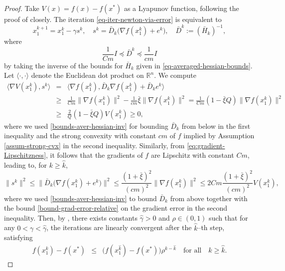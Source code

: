 \documentclass[final,numbook]{svjour3}
\begin{document}
\begin{proof}
   Take $V(x) = f(x) - f(x^*)$ as a Lyapunov function, following the proof of \cite[Theorem 2, Section 4.2.3]{Pol87} closely. The iteration \eqref{eq-iter-newton-via-error} is equivalent to 
   $$ x_1^{k+1} = x_1^k - \gamma s^k, \quad s^k = \bar{D}_k(\nabla f(x_1^k) + e^k \big), \quad \bar{D}^k := (\bar{H}_k)^{-1}, $$
where \begin{equation}\label{bounds-aver-hessian-inv} \frac{1}{Cm}I \preceq \bar{D}^k \preceq \frac{1}{cm}I
\end{equation}
by taking the inverse of the bounds for $\bar{H}_k$ given in \eqref{eq-averaged-hessian-bounds}. Let $\langle \cdot,\cdot \rangle$ denote the Euclidean dot product on ${\mathbb R}^n$. We compute 
  \begin{eqnarray*} \langle \nabla V (x_1^k), s^k \rangle &=& \langle \nabla f(x_1^k), \bar{D}_k\nabla f(x_1^k) + \bar{D}_k e^k  \rangle \\
   &\geq & \frac{1}{Cm} \| \nabla f(x_1^k) \|^2 - \frac{1}{cm} {{\bar{\xi}}}\| \nabla f(x_1^k) \|^2 =  \frac{1}{Cm} (1-{{\bar{\xi}}} Q)\| \nabla f(x_1^k) \|^2 \\
   & \geq & \frac{2}{Q}(1-{{\bar{\xi}}} Q) V(x_1^k) \geq 0,
  \end{eqnarray*}
where we used \eqref{bounds-aver-hessian-inv} for bounding $\bar{D}_k$ from below in the first inequality and the strong convexity with constant $cm$ of $f$ implied by Assumption \ref{assum-strong-cvx} in the second inequality.
Similarly, from \eqref{eq:gradient-Lipschitzness}, it follows that the gradients of $f$ are Lipschitz with constant $Cm$, leading to, for $k \geq {\hat{k}}$,
  $$ \|s^k\|^2 \leq \| \bar{D}_k(\nabla f(x_1^k) + e^k \big)\|^2 \leq \frac{(1+{{\bar{\xi}}})^2}{(cm)^2}  \|\nabla f(x_1^k)\|^2 \leq 2Cm \frac{(1+{{\bar{\xi}}})^2}{(cm)^2} V(x_1^k),$$
where we used \eqref{bounds-aver-hessian-inv} to bound $\bar{D}_k$ from above together with the bound \eqref{bound-grad-error-relative} on the gradient error in the second inequality. 
Then, by \cite[Theorem 4, Section 2.2]{Pol87}, there exists constants ${\hat{\gamma}} > 0$ and $\rho\in (0,1)$ such that for any $0 < \gamma < {\hat{\gamma}}$, the iterations are linearly convergent after the ${\hat{k}}$--th step, satisfying
  \begin{eqnarray*} f(x_1^k) - f(x^*) &\leq & \big(f(x_1^{\hat{k}}) - f(x^*)\big)\rho^{k-{\hat{k}}} \quad \mbox{for all} \quad k \geq {\hat{k}}.
  

\end{eqnarray*}
\end{proof}
\end{document}
